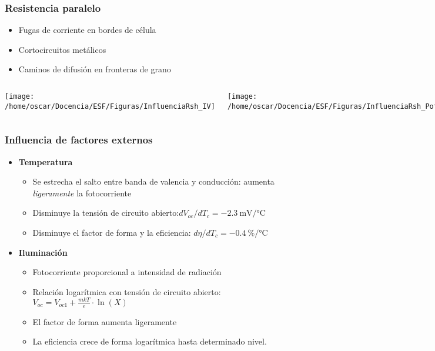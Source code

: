 \documentclass[xcolor=dvipsnames]{beamer}
\begin{document}
\begin{frame}
  \frametitle{Resistencia paralelo}
  \begin{block} {}
    \begin{itemize}
    \item Fugas de corriente en bordes de célula
    \item Cortocircuitos metálicos
    \item Caminos de difusión en fronteras de grano
    \end{itemize}
  \end{block}
  \begin{columns}[c]


    \column{6cm}

    \texttt{[image: /home/oscar/Docencia/ESF/Figuras/InfluenciaRsh\_IV]}


    \column{6cm}

    \texttt{[image: /home/oscar/Docencia/ESF/Figuras/InfluenciaRsh\_Potencia]}

  \end{columns}

\end{frame}

\begin{frame}
  \frametitle{Influencia de factores externos}
  \begin{itemize}
  \item \textbf{Temperatura}

    \begin{itemize}
    \item Se estrecha el salto entre banda de valencia y conducción:
      aumenta \emph{ligeramente} la fotocorriente
    \item Disminuye la tensión de circuito
      abierto:$dV_{oc}/dT_{c}=\SI{-2.3}{\milli\volt\per\celsius}$
    \item Disminuye el factor de forma y la eficiencia:
      $d\eta/dT_{c}=\SI{-0.4}{\percent\per\celsius}$
    \end{itemize}
  \item \textbf{Iluminación}

    \begin{itemize}
    \item Fotocorriente proporcional a intensidad de radiación
    \item Relación logarítmica con tensión de circuito abierto:
      $V_{oc}=V_{oc1}+\frac{mkT}{e}\cdot\ln(X)$
    \item El factor de forma aumenta ligeramente
    \item La eficiencia crece de forma logarítmica hasta determinado
      nivel.
    \end{itemize}
  \end{itemize}

\end{frame}
\end{document}
